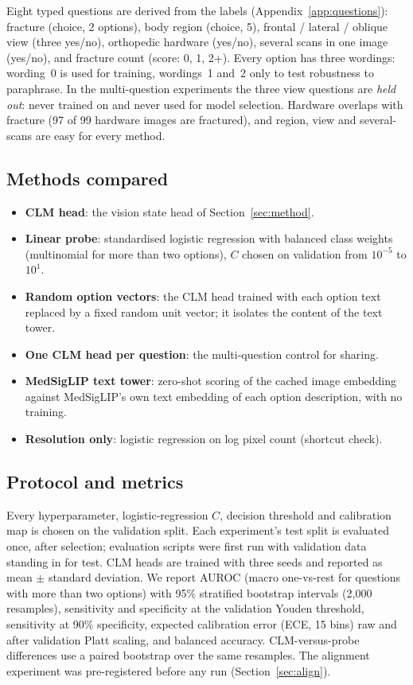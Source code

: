 \documentclass[11pt]{article}
\begin{document}
Eight typed questions are derived from the labels (Appendix~\ref{app:questions}): fracture (choice, 2 options),
body region (choice, 5), frontal / lateral / oblique view (three yes/no), orthopedic hardware (yes/no), several scans
in one image (yes/no), and fracture count (score: 0, 1, 2+). Every option has three wordings: wording~0 is used for
training, wordings~1 and~2 only to test robustness to paraphrase. In the multi-question experiments the three view
questions are \emph{held out}: never trained on and never used for model selection. Hardware overlaps with fracture
(97 of 99 hardware images are fractured), and region, view and several-scans are easy for every method.

\subsection{Methods compared}

\begin{itemize}
  \item \textbf{CLM head}: the vision state head of Section~\ref{sec:method}.
  \item \textbf{Linear probe}: standardised logistic regression with balanced class weights (multinomial for more
        than two options), $C$ chosen on validation from $10^{-5}$ to $10^{1}$.
  \item \textbf{Random option vectors}: the CLM head trained with each option text replaced by a fixed random unit
        vector; it isolates the content of the text tower.
  \item \textbf{One CLM head per question}: the multi-question control for sharing.
  \item \textbf{MedSigLIP text tower}: zero-shot scoring of the cached image embedding against MedSigLIP's own text
        embedding of each option description, with no training.
  \item \textbf{Resolution only}: logistic regression on log pixel count (shortcut check).
\end{itemize}

\subsection{Protocol and metrics}

Every hyperparameter, logistic-regression $C$, decision threshold and calibration map is chosen on the validation
split. Each experiment's test split is evaluated once, after selection; evaluation scripts were first run with
validation data standing in for test. CLM heads are trained with three seeds and reported as mean $\pm$ standard
deviation. We report AUROC (macro one-vs-rest for questions with more than two options) with 95\% stratified
bootstrap intervals \citep{efron1993bootstrap} (2{,}000 resamples), sensitivity and specificity at the validation
Youden threshold, sensitivity at 90\% specificity, expected calibration error (ECE, 15 bins) raw and after
validation Platt scaling, and balanced accuracy. CLM-versus-probe differences use a paired bootstrap over the same
resamples. The alignment experiment was pre-registered before any run (Section~\ref{sec:align}).
\end{document}
